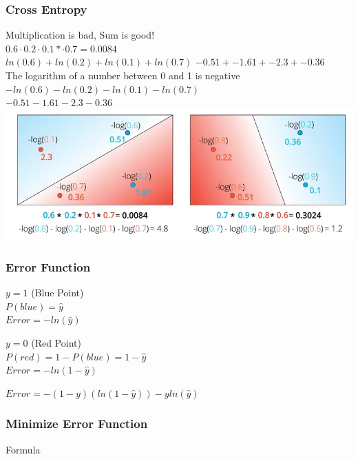 \begin{frame}[fragile]
  \frametitle{Cross Entropy}
  Multiplication is bad, Sum is good!\\

  \vspace{3mm}
  $0.6 \cdot 0.2 \cdot 0.1 * \cdot 0.7 = 0.0084$\\
  $ln(0.6) + ln(0.2) + ln(0.1) + ln(0.7)$
  $-0.51 + -1.61 + -2.3 + -0.36$\\

  \vspace{3mm}
  The logarithm of a number between 0 and 1 is negative\\
  $-ln(0.6) - ln(0.2) - ln(0.1) - ln(0.7)$\\
  $-0.51 - 1.61 - 2.3 - 0.36$\\

  \vspace{3mm}
  \includegraphics[scale=0.3]{img/crossentropy}

\end{frame}

\begin{frame}[fragile]
  \frametitle{Error Function}
  $y = 1$ (Blue Point)\\
  $P(blue) = \hat{y}$\\
  $Error = -ln(\hat{y})$\\

  \vspace{3mm}

  $y = 0$ (Red Point)\\
  $P(red) = 1 - P(blue) = 1 - \hat{y}$\\
  $Error = -ln(1 - \hat{y})$\\

  \vspace{3mm}

  $Error = -(1-y)(ln(1-\hat{y})) - y ln(\hat{y})$
\end{frame}

\begin{frame}[fragile]
  \frametitle{Minimize Error Function}
  Formula
\end{frame}

